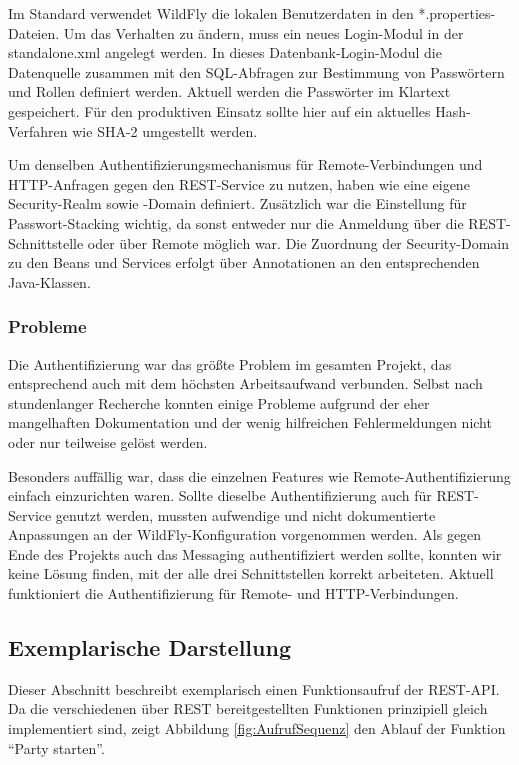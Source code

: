 Im Standard verwendet WildFly die lokalen Benutzerdaten in den *.properties-Dateien. Um das Verhalten zu ändern, muss ein neues Login-Modul in der standalone.xml angelegt werden. In dieses Datenbank-Login-Modul die Datenquelle zusammen mit den SQL-Abfragen zur Bestimmung von Passwörtern und Rollen definiert werden. Aktuell werden die Passwörter im Klartext gespeichert. Für den produktiven Einsatz sollte hier auf ein aktuelles Hash-Verfahren wie SHA-2 umgestellt werden.

Um denselben Authentifizierungsmechanismus für Remote-Verbindungen und HTTP-Anfragen gegen den REST-Service zu nutzen, haben wie eine eigene Security-Realm sowie -Domain definiert. Zusätzlich war die Einstellung für Passwort-Stacking wichtig, da sonst entweder nur die Anmeldung über die REST-Schnittstelle oder über Remote möglich war. Die Zuordnung der Security-Domain zu den Beans und Services erfolgt über Annotationen an den entsprechenden Java-Klassen. 

\subsubsection{Probleme}
Die Authentifizierung war das größte Problem im gesamten Projekt, das entsprechend auch mit dem höchsten Arbeitsaufwand verbunden. Selbst nach stundenlanger Recherche konnten einige Probleme aufgrund der eher mangelhaften Dokumentation und der wenig hilfreichen Fehlermeldungen nicht oder nur teilweise gelöst werden.

Besonders auffällig war, dass die einzelnen Features wie Remote-Authentifizierung einfach einzurichten waren. Sollte dieselbe Authentifizierung auch für REST-Service genutzt werden, mussten aufwendige und nicht dokumentierte Anpassungen an der WildFly-Konfiguration vorgenommen werden. Als gegen Ende des Projekts auch das Messaging authentifiziert werden sollte, konnten wir keine Lösung finden, mit der alle drei Schnittstellen korrekt arbeiteten. Aktuell funktioniert die Authentifizierung für Remote- und HTTP-Verbindungen. 


\subsection{Exemplarische Darstellung}
Dieser Abschnitt beschreibt exemplarisch einen Funktionsaufruf der REST-API. Da die verschiedenen über REST bereitgestellten Funktionen prinzipiell gleich implementiert sind, zeigt Abbildung \ref{fig:AufrufSequenz} den Ablauf der Funktion "`Party starten"'.


